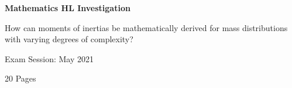 \begin{titlepage}
    \begin{center}
        \vspace*{3cm}
        

        \Large
        \textbf{Mathematics HL Investigation}

        \vspace{0.5cm}

        How can moments of inertias be mathematically derived for mass distributions with varying degrees of complexity?


        \vspace{1.5cm}

        Exam Session: May 2021
            
        \vfill

        20 Pages
            
            
            
    \end{center}
\end{titlepage}